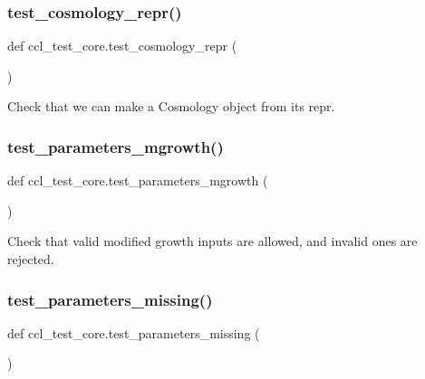 \subsubsection{\texorpdfstring{test\+\_\+cosmology\+\_\+repr()}{test\_cosmology\_repr()}}
{\footnotesize\ttfamily def ccl\+\_\+test\+\_\+core.\+test\+\_\+cosmology\+\_\+repr (\begin{DoxyParamCaption}{ }\end{DoxyParamCaption})}

\begin{DoxyVerb}Check that we can make a Cosmology object from its repr.\end{DoxyVerb}
 \mbox{\label{namespaceccl__test__core_a1cf68bb2178c995528cfa1a7f1c14832}} 
\subsubsection{\texorpdfstring{test\+\_\+parameters\+\_\+mgrowth()}{test\_parameters\_mgrowth()}}
{\footnotesize\ttfamily def ccl\+\_\+test\+\_\+core.\+test\+\_\+parameters\+\_\+mgrowth (\begin{DoxyParamCaption}{ }\end{DoxyParamCaption})}

\begin{DoxyVerb}Check that valid modified growth inputs are allowed, and invalid ones are
rejected.
\end{DoxyVerb}
 \mbox{\label{namespaceccl__test__core_a0e549d6d40a6192560d27eeee5a52c6a}} 
\subsubsection{\texorpdfstring{test\+\_\+parameters\+\_\+missing()}{test\_parameters\_missing()}}
{\footnotesize\ttfamily def ccl\+\_\+test\+\_\+core.\+test\+\_\+parameters\+\_\+missing (\begin{DoxyParamCaption}{ }\end{DoxyParamCaption})}

